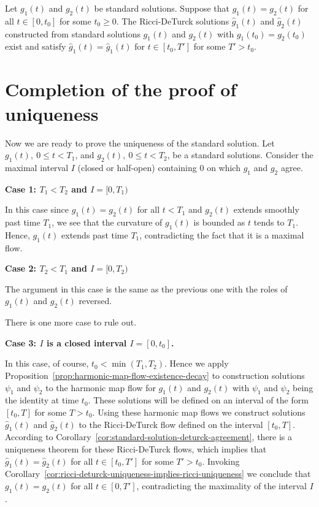 \begin{corollary}
\label{cor:standard-solution-deturck-agreement}
\label{duniq}
Let $g_1(t)$ and $g_2(t)$  be standard solutions. Suppose that
$g_1(t)=g_2(t)$ for all $t\in [0,t_0]$ for some $t_0\ge 0$. The
Ricci-DeTurck solutions $\hat{g}_1(t)$ and $\hat{g}_2(t)$
constructed from standard solutions $g_1(t)$ and $g_2(t)$ with
$g_1(t_0)=g_2(t_0)$ exist and satisfy $\hat{g}_1(t)=\hat{g}_1(t)$
for $t \in [t_0,T']$ for some $T'>t_0$.
\end{corollary}




\section{Completion of the proof of uniqueness}

Now we are ready to prove the uniqueness of the standard solution.
Let $g_1(t),\ 0\le t<T_1$, and $g_2(t),\ 0\le t<T_2$, be a standard
solutions. Consider the maximal interval $I$ (closed or half-open)
containing $0$ on which $g_1$ and $g_2$ agree.

{\bf Case 1: $T_1< T_2$ and $I=[0,T_1)$}

In this case since $g_1(t)=g_2(t)$ for all $t<T_1$ and $g_2(t)$
extends smoothly past time $T_1$, we see that the curvature of
$g_1(t)$ is bounded as $t$ tends to $T_1$. Hence, $g_1(t)$ extends
past time $T_1$, contradicting the fact that it is a maximal flow.

{\bf Case 2: $T_2<T_1$ and $I=[0,T_2)$}

The argument in this case is the same as the previous one with the
roles of $g_1(t)$ and $g_2(t)$ reversed.

There is one more case to rule out.


{\bf Case 3: $I$ is a closed interval $I=[0,t_0]$.}

In this case, of course, $t_0<\min(T_1,T_2)$. Hence we apply
Proposition~\ref{prop:harmonic-map-flow-existence-decay} to construction solutions $\psi_1$ and
$\psi_2$ to the harmonic map flow for $g_1(t)$ and $g_2(t)$ with
$\psi_1$ and $\psi_2$ being the identity at time $t_0$. These
solutions will be defined on an interval of the form $[t_0,T]$ for
some $T>t_0$. Using these harmonic map flows we construct solutions
$\hat g_1(t)$ and $\hat g_2(t)$ to the Ricci-DeTurck flow defined on
the interval $[t_0,T]$. According to Corollary~\ref{cor:standard-solution-deturck-agreement}, there is
a uniqueness theorem for these Ricci-DeTurck flows, which implies
that $\hat g_1(t)=\hat g_2(t)$ for all $t\in [t_0,T']$ for some
$T'>t_0$. Invoking Corollary~\ref{cor:ricci-deturck-uniqueness-implies-ricci-uniqueness} we conclude that
$g_1(t)=g_2(t)$ for all $t\in [0,T']$, contradicting the maximality
of the interval $I$.

